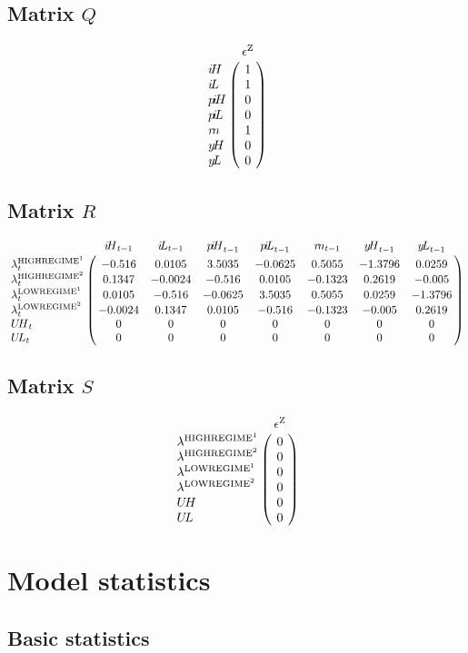 \subsection*{Matrix $Q$}

$$\bordermatrix{
~ & \epsilon^{\mathrm{Z}} \cr
{i\!H} & 1 \cr
{i\!L} & 1 \cr
{p\!i\!H} & 0 \cr
{p\!i\!L} & 0 \cr
{r\!n} & 1 \cr
{y\!H} & 0 \cr
{y\!L} & 0 \cr
}$$

\subsection*{Matrix $R$}

$$\bordermatrix{
~ & {i\!H}_{t-1} & {i\!L}_{t-1} & {p\!i\!H}_{t-1} & {p\!i\!L}_{t-1} & {r\!n}_{t-1} & {y\!H}_{t-1} & {y\!L}_{t-1} \cr
\lambda^{\mathrm{HIGHREGIME}^{\mathrm{1}}}_{t} & -0.516 & 0.0105 & 3.5035 & -0.0625 & 0.5055 & -1.3796 & 0.0259 \cr
\lambda^{\mathrm{HIGHREGIME}^{\mathrm{2}}}_{t} & 0.1347 & -0.0024 & -0.516 & 0.0105 & -0.1323 & 0.2619 & -0.005 \cr
\lambda^{\mathrm{LOWREGIME}^{\mathrm{1}}}_{t} & 0.0105 & -0.516 & -0.0625 & 3.5035 & 0.5055 & 0.0259 & -1.3796 \cr
\lambda^{\mathrm{LOWREGIME}^{\mathrm{2}}}_{t} & -0.0024 & 0.1347 & 0.0105 & -0.516 & -0.1323 & -0.005 & 0.2619 \cr
{U\!H}_{t} & 0 & 0 & 0 & 0 & 0 & 0 & 0 \cr
{U\!L}_{t} & 0 & 0 & 0 & 0 & 0 & 0 & 0 \cr
}$$

\subsection*{Matrix $S$}

$$\bordermatrix{
~ & \epsilon^{\mathrm{Z}} \cr
\lambda^{\mathrm{HIGHREGIME}^{\mathrm{1}}} & 0 \cr
\lambda^{\mathrm{HIGHREGIME}^{\mathrm{2}}} & 0 \cr
\lambda^{\mathrm{LOWREGIME}^{\mathrm{1}}} & 0 \cr
\lambda^{\mathrm{LOWREGIME}^{\mathrm{2}}} & 0 \cr
{U\!H} & 0 \cr
{U\!L} & 0 \cr
}$$


\section{Model statistics}

\subsection{Basic statistics}

